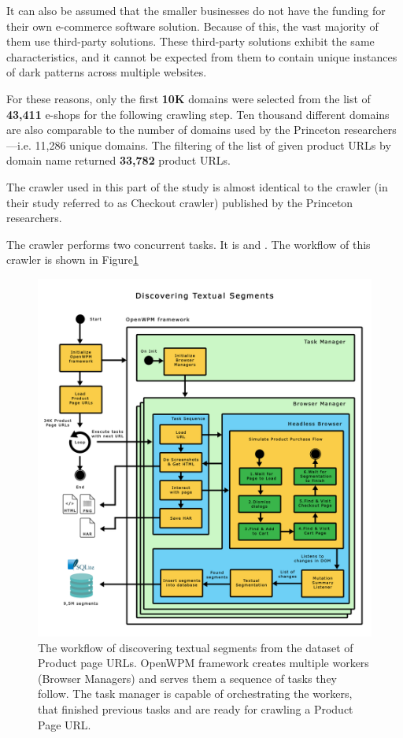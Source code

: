         It can also be assumed that the smaller businesses do not have the funding for their own e-commerce software solution. Because of this, the vast majority of them use third-party solutions. These third-party solutions exhibit the same characteristics, and it cannot be expected from them to contain unique instances of dark patterns across multiple websites. 
        
        For these reasons, only the first \textbf{10K} domains were selected from the list of \textbf{43,411} e-shops for the following crawling step. Ten thousand different domains are also comparable to the number of domains used by the Princeton researchers---i.e. 11,286 unique domains. The filtering of the list of given product URLs by domain name returned \textbf{33,782} product URLs.
        
        The crawler used in this part of the study is almost identical to the crawler (in their study referred to as Checkout crawler) published by the Princeton researchers.

        The crawler performs two concurrent tasks. It is  and . The workflow of this crawler is shown in Figure\ref{fig:data_collection2}

        \begin{figure}[ht]
            \centering
            \includegraphics[width=1\linewidth]{media/data_collection2.png}
            \caption{The workflow of discovering textual segments from the dataset of Product page URLs. OpenWPM framework creates multiple workers (Browser Managers) and serves them a sequence of tasks they follow. The task manager is capable of orchestrating the workers, that finished previous tasks and are ready for crawling a Product Page URL.}
            \label{fig:data_collection2}
        \end{figure}

